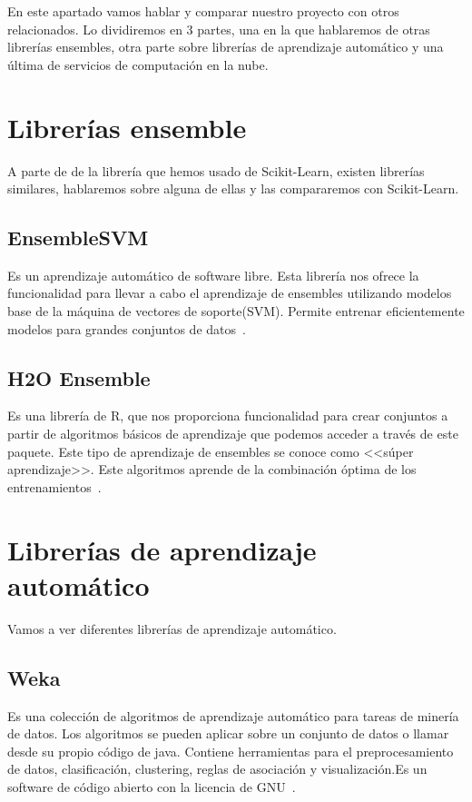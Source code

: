 En este apartado vamos hablar y comparar nuestro proyecto con otros relacionados. Lo dividiremos en 3 partes, una en la que hablaremos de otras librerías ensembles, otra parte sobre librerías de aprendizaje automático y una última de servicios de computación en la nube.

\section{Librerías ensemble}
A parte de de la librería que hemos usado de Scikit-Learn, existen librerías similares, hablaremos sobre alguna de ellas y las compararemos con Scikit-Learn.

\subsection{EnsembleSVM}
Es un aprendizaje automático de software libre. Esta librería nos ofrece la funcionalidad para llevar a cabo el aprendizaje de ensembles utilizando modelos base de la máquina de vectores de soporte(SVM). Permite entrenar eficientemente modelos para grandes conjuntos de datos~\cite{ensembleSVM}.

\subsection{H2O Ensemble}
Es una librería de R, que nos proporciona funcionalidad para crear conjuntos a partir de algoritmos básicos de aprendizaje que podemos acceder a través de este paquete. Este tipo de aprendizaje de ensembles se conoce como <<súper aprendizaje>>. Este algoritmos aprende de la combinación óptima de los entrenamientos~\cite{ensembleh2o}.

\section{Librerías de aprendizaje automático}
Vamos a ver diferentes librerías de aprendizaje automático.
\subsection{Weka}
Es una colección de algoritmos de aprendizaje automático para tareas de minería de datos. Los algoritmos se pueden aplicar sobre un conjunto de datos o llamar desde su propio código de java. Contiene herramientas para el preprocesamiento de datos, clasificación, clustering, reglas de asociación y visualización.Es un software de código abierto con la licencia de GNU~\cite{weka}. 

